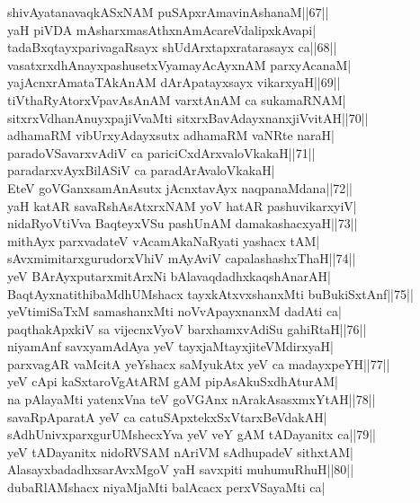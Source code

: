 \documentclass{article}
\begin{document}
shivAyatanavaqkASxNAM puSApxrAmavinAshanaM||67||\\
yaH piVDA mAsharxmasAthxnAmAcareVdalipxkAvapi|\\
tadaBxqtayxparivagaRsayx shUdArxtapxratarasayx ca||68||\\
vasatxrxdhAnayxpashusetxVyamayAcAyxnAM parxyAcanaM|\\
yajAcnxrAmataTAkAnAM dArApatayxsayx vikarxyaH||69||\\
tiVthaRyAtorxVpavAsAnAM varxtAnAM ca sukamaRNAM|\\
sitxrxVdhanAnuyxpajiVvaMti sitxrxBavAdayxnanxjiVvitAH||70||\\
adhamaRM vibUrxyAdayxsutx adhamaRM vaNRte naraH|\\
paradoVSavarxvAdiV ca pariciCxdArxvaloVkakaH||71||\\
paradarxvAyxBilASiV ca paradArAvaloVkakaH|\\
EteV goVGanxsamAnAsutx jAcnxtavAyx naqpanaMdana||72||\\
yaH katAR savaRshAsAtxrxNAM yoV hatAR pashuvikarxyiV|\\
nidaRyoVtiVva BaqteyxVSu pashUnAM damakashacxyaH||73||\\
mithAyx parxvadateV vAcamAkaNaRyati yashacx tAM|\\
sAvxmimitarxgurudorxVhiV mAyAviV capalashashxThaH||74||\\
yeV BArAyxputarxmitArxNi bAlavaqdadhxkaqshAnarAH|\\
BaqtAyxnatithibaMdhUMshacx tayxkAtxvxshanxMti buBukiSxtAnf||75||\\
yeVtimiSaTxM samashanxMti noVvApayxnanxM dadAti ca|\\
paqthakApxkiV sa vijecnxVyoV barxhamxvAdiSu gahiRtaH||76||\\
niyamAnf savxyamAdAya yeV tayxjaMtayxjiteVMdirxyaH|\\
parxvagAR vaMcitA yeYshacx saMyukAtx yeV ca madayxpeYH||77||\\
yeV cApi kaSxtaroVgAtARM gAM pipAsAkuSxdhAturAM|\\
na pAlayaMti yatenxVna teV goVGAnx nArakAsasxmxYtAH||78||\\
savaRpAparatA yeV ca catuSApxtekxSxVtarxBeVdakAH|\\
sAdhUnivxparxgurUMshecxYva yeV veY gAM tADayanitx ca||79||\\
yeV tADayanitx nidoRVSAM nAriVM sAdhupadeV sithxtAM|\\
AlasayxbadadhxsarAvxMgoV yaH savxpiti muhumuRhuH||80||\\
dubaRlAMshacx niyaMjaMti balAcacx perxVSayaMti ca|\\
\end{document}
